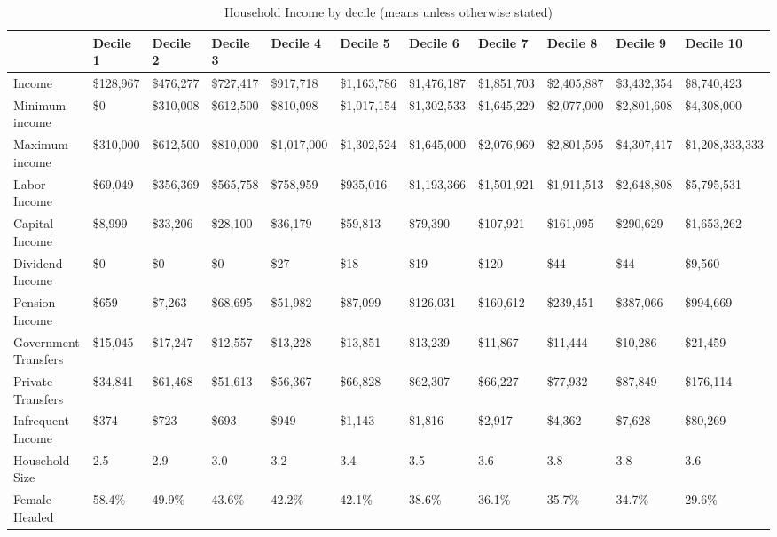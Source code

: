 \documentclass[12pt]{article}
\begin{document}
\begin{landscape}

\begin{table}[]
\caption{Household Income by decile (means unless otherwise stated)}
\label{tab:ydecile}
\footnotesize
\begin{tabular}{lllllllllll} \hline
& Decile 1                              & Decile 2  & Decile 3  & Decile 4  & Decile 5    & Decile 6    & Decile 7    & Decile 8    & Decile 9    & Decile 10                    \\ \hline
Income                           & \$128,967 & \$476,277 & \$727,417 & \$917,718   & \$1,163,786 & \$1,476,187 & \$1,851,703 & \$2,405,887 & \$3,432,354 & \$8,740,423     \\
Minimum income                        & \$0       & \$310,008 & \$612,500 & \$810,098   & \$1,017,154 & \$1,302,533 & \$1,645,229 & \$2,077,000 & \$2,801,608 & \$4,308,000     \\
Maximum income                        & \$310,000 & \$612,500 & \$810,000 & \$1,017,000 & \$1,302,524 & \$1,645,000 & \$2,076,969 & \$2,801,595 & \$4,307,417 & \$1,208,333,333 \\
Labor Income                     & \$69,049  & \$356,369 & \$565,758 & \$758,959   & \$935,016   & \$1,193,366 & \$1,501,921 & \$1,911,513 & \$2,648,808 & \$5,795,531     \\
Capital Income                   & \$8,999   & \$33,206  & \$28,100  & \$36,179    & \$59,813    & \$79,390    & \$107,921   & \$161,095   & \$290,629   & \$1,653,262     \\
Dividend Income                  & \$0       & \$0       & \$0       & \$27        & \$18        & \$19        & \$120       & \$44        & \$44        & \$9,560         \\
Pension Income                   & \$659     & \$7,263   & \$68,695  & \$51,982    & \$87,099    & \$126,031   & \$160,612   & \$239,451   & \$387,066   & \$994,669       \\
Government Transfers & \$15,045  & \$17,247  & \$12,557  & \$13,228    & \$13,851    & \$13,239    & \$11,867    & \$11,444    & \$10,286    & \$21,459        \\
Private Transfers    & \$34,841  & \$61,468  & \$51,613  & \$56,367    & \$66,828    & \$62,307    & \$66,227    & \$77,932    & \$87,849    & \$176,114       \\
Infrequent Income                & \$374     & \$723     & \$693     & \$949       & \$1,143     & \$1,816     & \$2,917     & \$4,362     & \$7,628     & \$80,269        \\
Household Size                   & 2.5       & 2.9       & 3.0       & 3.2         & 3.4         & 3.5         & 3.6         & 3.8         & 3.8         & 3.6             \\
Female-Headed              & 58.4\%    & 49.9\%    & 43.6\%    & 42.2\%      & 42.1\%      & 38.6\%      & 36.1\%      & 35.7\%      & 34.7\%      & 29.6\%         \\ \hline
\end{tabular}
\end{table}


\end{landscape}
\end{document}
